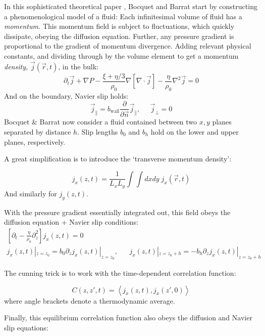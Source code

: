 \documentclass[12pt, a4paper, twoside, openright]{book}
\begin{document}
In this sophisticated theoretical paper \cite{BocquetBarrat1994}, Bocquet and Barrat start by constructing a phenomenological model of a fluid: Each infinitesimal volume of fluid has a \emph{momentum.} This momentum field is subject to fluctuations, which quickly dissipate, obeying the diffusion equation. Further, any pressure gradient is proportional to the gradient of momentum divergence. Adding relevant physical constants, and dividing through by the volume element to get a momentum \emph{density,} $\vec{j}(\vec{r},t)$, in the bulk:
\begin{equation}
 \partial_{t} \vec{j}+\nabla P - \frac{\xi+\eta/3}{\rho_{0}}\nabla
 [\nabla \cdot \vec{j}] - \frac{\eta}{\rho_{0}} \nabla^{2} \vec{j} = 0
\end{equation}
And on the boundary, Navier slip holds:
\begin{equation}
\vec{j}_{\parallel} = b_{\mathrm{wall}} \frac{\partial}{\partial \vec{n}}
 \vec{j}_{\parallel} , \;\;\;\;\; \vec{j}_{\perp} = 0
\end{equation}
Bocquet \& Barrat now consider a fluid contained between two $x,y$ planes separated by distance $h$. Slip lengths $b_{0}$ and $b_{h}$ hold on the lower and upper planes, respectively.

A great simplification is to introduce the `transverse momentum density':

\begin{equation}
j_{x}(z,t) = \frac{1}{L_{x}L_{y}} \int \int dx dy \; j_{x}(\vec{r},t)
\end{equation}
And similarly for $j_{y}(z,t)$.

With the pressure gradient essentially integrated out, this field obeys the diffusion equation + Navier slip conditions:
\begin{gather}
\left[ \partial_{t} - \frac{\eta}{\rho_{0}} \partial_{z}^{2} \right]
j_{x}(z,t) = 0
\\
j_{x}(z,t)|_{z=z_{0}} = b_{0} \partial_{z} j_{x}(z,t)|_{z=z_{0}} , \;\;\;\
\;\;  j_{x}(z,t)|_{z=z_{0}+h} = -b_{h} \partial_{z} j_{x}(z,t)|_{z=z_{0}+h}
\end{gather}

The cunning trick is to work with the time-dependent correlation function:

\begin{equation}
C(z,z',t) = \left< j_{x}(z,t), j_{x}(z',0) \right>
\end{equation}
where angle brackets denote a thermodynamic average.

Finally, this equilibrium correlation function also obeys the diffusion and Navier slip equations:
\end{document}
